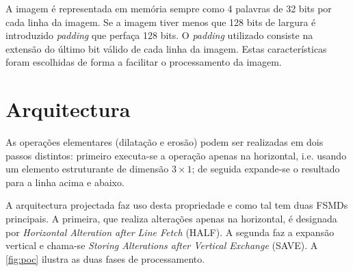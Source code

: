 \documentclass[a4paper]{article}
\begin{document}
A imagem é representada em memória sempre como 4 palavras de 32 bits por cada linha da imagem. Se a imagem tiver menos que 128 bits de largura é introduzido \textit{padding} que perfaça 128 bits. O \textit{padding} utilizado consiste na extensão do último bit válido de cada linha da imagem. Estas características foram escolhidas de forma a facilitar o processamento da imagem.

\section{Arquitectura}
As operações elementares (dilatação e erosão) podem ser realizadas em dois passos distintos: primeiro executa-se a operação apenas na horizontal, i.e. usando um elemento estruturante de dimensão $3\times1$; de seguida expande-se o resultado para a linha acima e abaixo.

A arquitectura projectada faz uso desta propriedade e como tal tem duas FSMDs principais. A primeira, que realiza alterações apenas na horizontal, é designada por \textit{Horizontal Alteration after Line Fetch} (HALF). A segunda faz a expansão vertical e chama-se \textit{Storing Alterations after Vertical Exchange} (SAVE). A \autoref{fig:poc} ilustra as duas fases de processamento.
\end{document}
